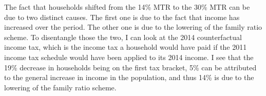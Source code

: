 The fact that households shifted from the 14\% MTR to the 30\% MTR can be due to two distinct causes. The first one is due to the fact that income has increased over the period. The other one is due to the lowering of the family ratio scheme. To disentangle those the two, I can look at the 2014 counterfactual income tax, which is the income tax a household would have paid if the 2011 income tax schedule would have been applied to its 2014 income. I see that the 19\% decrease in households being on the first tax bracket, 5\% can be attributed to the general increase in income in the population, and thus 14\% is due to the lowering of the family ratio scheme.


									
